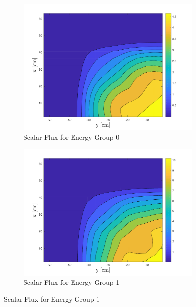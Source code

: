 \begin{figure}[!htbp]
\centering
\begin{subfigure}[b]{0.75\textwidth}
        \includegraphics[width=\textwidth]{Figures/HigherDimEigen/AlphaScalarFluxRQ_g=0}
        \caption{Scalar Flux for Energy Group 0}
   \label{fig:2DScalarFluxAlpha0} 
\end{subfigure}

\begin{subfigure}[b]{0.75\textwidth}
        \includegraphics[width=\textwidth]{Figures/HigherDimEigen/AlphaScalarFluxRQ_g=1}
        \caption{Scalar Flux for Energy Group 1}
   \label{fig:2DScalarFluxAlpha1} 
\end{subfigure}
\end{figure}
